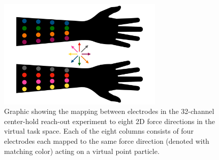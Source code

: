 \documentclass[
  a4paper,
]{article}
\begin{document}
\begin{figure}
\hypertarget{fig:columns}{%
\centering
\includegraphics[width=0.7\textwidth,height=\textheight]{images/hardware/columns.pdf}
\caption{Graphic showing the mapping between electrodes in the
32-channel center-hold reach-out experiment to eight 2D force directions
in the virtual task space. Each of the eight columns consists of four
electrodes each mapped to the same force direction (denoted with
matching color) acting on a virtual point particle.}\label{fig:columns}
}
\end{figure}
\end{document}
